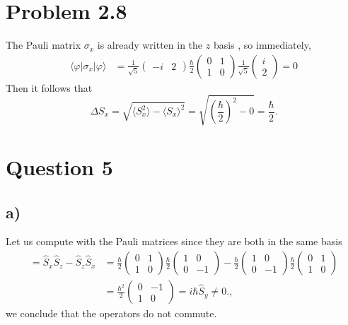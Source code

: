 \documentclass[
	12pt,
	]{article}
\newcommand{\la}{\langle}
\newcommand{\ra}{\rangle}
\theoremstyle{definition}
\theoremstyle{definition}
\theoremstyle{definition}
\theoremstyle{definition}
\theoremstyle{definition}
\theoremstyle{example}
\theoremstyle{note}
\theoremstyle{remark}
\theoremstyle{example}
\begin{document}
			\section*{Problem 2.8}
				The Pauli matrix $\sigma_{x}$ is already written in the $z$ basis , so immediately, 
				\begin{align*}
					\la \varphi \lvert  \sigma_{x} \rvert \varphi \ra &= \frac{1}{\sqrt{5}} \begin{pmatrix}
					-i & 2
					\end{pmatrix} \frac{\hbar}{2} \begin{pmatrix}
					0 & 1 \\ 1 & 0 
					\end{pmatrix} \frac{1}{\sqrt{5}} \begin{pmatrix}
					i \\ 2
					\end{pmatrix} = 0
				\end{align*}
				Then it follows that 
				$$ \Delta S_{x}  = \sqrt{\la S_{x}^{2} \ra - \la S_{x} \ra^{2}}  = \sqrt{\left(\frac{\hbar}{2}\right)^{2} -0 } = \frac{\hbar}{2}.$$
			\section*{Question 5}
				\subsection*{a) }
					Let us compute with the Pauli matrices since they are both in the same basis
					\begin{align*}
						 [\hat{S}_{x} , \hat{S}_{z}] = \hat{S}_{x} \hat{S}_{z} - \hat{S}_{z}\hat{S}_{x} &=\frac{\hbar}{2} \begin{pmatrix}
						 	0 & 1 \\ 1& 0 
						 \end{pmatrix} 
						 \frac{\hbar}{2} \begin{pmatrix}
						 	1 & 0 \\ 0& -1 
						 \end{pmatrix} - \frac{\hbar}{2} \begin{pmatrix}
						 1 & 0 \\ 0& -1 
						 \end{pmatrix}\frac{\hbar}{2} \begin{pmatrix}
						 0 & 1 \\ 1& 0 
						 \end{pmatrix} \\
						 &= \frac{\hbar^{2}}{2} \begin{pmatrix}
						 0 & -1 \\
						 1 & 0
						 \end{pmatrix} = i \hbar \hat{S}_{y} \neq 0.,
 					\end{align*}
 					we conclude that the operators do not commute.
\end{document}
